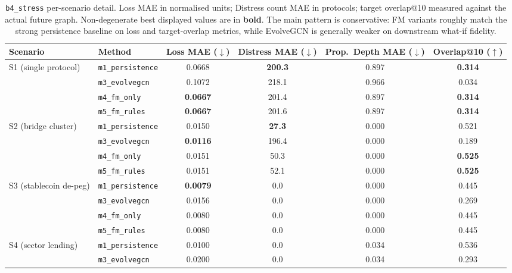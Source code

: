 \begin{table}[!htbp]
\centering
\footnotesize
\setlength{\tabcolsep}{4pt}
\caption{\texttt{b4\_stress} per-scenario detail. Loss MAE in normalised
units; Distress count MAE in protocols; target overlap@10 measured against
the actual future graph. Non-degenerate best displayed values are in
\textbf{bold}. The main
pattern is conservative: FM variants roughly match the strong persistence
baseline on loss and target-overlap metrics, while EvolveGCN is generally
weaker on downstream what-if fidelity.}
\label{tab:b4_detail}
\begin{tabular}{l l c c c c}
\toprule
Scenario & Method & Loss MAE ($\downarrow$) & Distress MAE ($\downarrow$) & Prop.~Depth MAE ($\downarrow$) & Overlap@10 ($\uparrow$) \\
\midrule
\multirow{4}{*}{S1 (single protocol)}
& \texttt{m1\_persistence} & 0.0668 & \textbf{200.3} & 0.897 & \textbf{0.314} \\
& \texttt{m3\_evolvegcn}   & 0.1072 & 218.1 & 0.966 & 0.034 \\
& \texttt{m4\_fm\_only}    & \textbf{0.0667} & 201.4 & 0.897 & \textbf{0.314} \\
& \texttt{m5\_fm\_rules}   & \textbf{0.0667} & 201.6 & 0.897 & \textbf{0.314} \\
\midrule
\multirow{4}{*}{S2 (bridge cluster)}
& \texttt{m1\_persistence} & 0.0150 & \textbf{27.3} & 0.000 & 0.521 \\
& \texttt{m3\_evolvegcn}   & \textbf{0.0116} & 196.4 & 0.000 & 0.189 \\
& \texttt{m4\_fm\_only}    & 0.0151 & 50.3 & 0.000 & \textbf{0.525} \\
& \texttt{m5\_fm\_rules}   & 0.0151 & 52.1 & 0.000 & \textbf{0.525} \\
\midrule
\multirow{4}{*}{S3 (stablecoin de-peg)}
& \texttt{m1\_persistence} & \textbf{0.0079} & 0.0 & 0.000 & 0.445 \\
& \texttt{m3\_evolvegcn}   & 0.0156 & 0.0 & 0.000 & 0.269 \\
& \texttt{m4\_fm\_only}    & 0.0080 & 0.0 & 0.000 & 0.445 \\
& \texttt{m5\_fm\_rules}   & 0.0080 & 0.0 & 0.000 & 0.445 \\
\midrule
\multirow{4}{*}{S4 (sector lending)}
& \texttt{m1\_persistence} & 0.0100 & 0.0 & 0.034 & 0.536 \\
& \texttt{m3\_evolvegcn}   & 0.0200 & 0.0 & 0.034 & 0.293 \\

\end{tabular}
\end{table}
